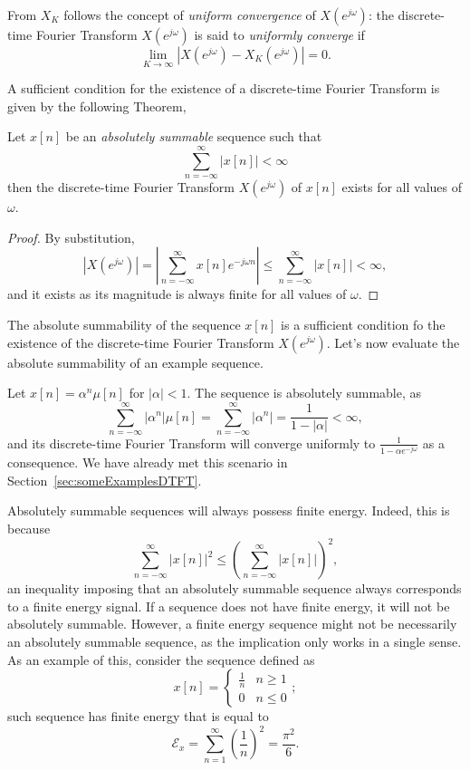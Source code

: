 \documentclass[\documentfontsize, twocolumn]{\classname}
\begin{document}
From $X_K$ follows the concept of \emph{uniform convergence} of $X(e^{j\omega})$: the discrete-time Fourier Transform $X(e^{j\omega})$ is said to \emph{uniformly converge} if
\begin{equation}\label{eqn:uniformConvergence}
    \lim_{K\rightarrow \infty}\left|X(e^{j\omega}) - X_K(e^{j\omega})\right| = 0.
\end{equation}

A sufficient condition for the existence of a discrete-time Fourier Transform is given by the following Theorem,
\begin{thm}
    Let $x[n]$ be an \emph{absolutely summable} sequence such that 
    \[
        \sum_{n=-\infty}^{\infty}|x[n]| < \infty
    \]
    then the discrete-time Fourier Transform $X(e^{j\omega})$ of $x[n]$ exists for all values of $\omega$.
\end{thm}

\begin{proof}
    By substitution,
    \[
        \left|X(e^{j\omega})\right| = \left|\sum_{n=-\infty}^\infty x[n] e^{-j\omega n}\right| \leq \sum_{n=-\infty}^\infty|x[n]| < \infty,
    \]
    and it exists as its magnitude is always finite for all values of $\omega$.
\end{proof}

The absolute summability of the sequence $x[n]$ is a sufficient condition fo the existence of the discrete-time Fourier Transform $X(e^{j\omega})$. Let's now evaluate the absolute summability of an example sequence.

Let $x[n] = \alpha^n \mu[n]$ for $|\alpha| < 1$. The sequence is absolutely summable, as
\[
    \sum_{n=-\infty}^\infty |\alpha^n| \mu[n] = \sum_{n=-\infty}^\infty |\alpha^n| = \frac {1}{1-|\alpha|} < \infty,
\]
and its discrete-time Fourier Transform will converge uniformly to $\frac{1}{1-\alpha e^{-j\omega}}$ as a consequence. We have already met this scenario in Section~\ref{sec:someExamplesDTFT}.

Absolutely summable sequences will always possess finite energy. Indeed, this is because 
\[
    \sum_{n=-\infty}^\infty |x[n]|^2 \leq \left(\sum_{n=-\infty}^\infty |x[n]|\right)^2,
\]
an inequality imposing that an absolutely summable sequence always corresponds to a finite energy signal. If a sequence does not have finite energy, it will not be absolutely summable. However, a finite energy sequence might not be necessarily an absolutely summable sequence, as the implication only works in a single sense. As an example of this, consider the sequence defined as
\[
    x[n] = \left\{\begin{array}{ll} \frac 1 n & n \geq 1 \\ 0 & n \leq 0\end{array}\right.;
\]
such sequence has finite energy that is equal to
\[
    \mathcal E_x = \sum_{n=1}^\infty \left(\frac 1 n\right)^2 = \frac {\pi^2}{6}.
\]
\end{document}
